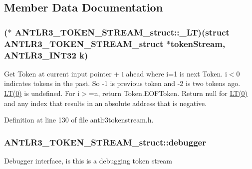 \subsection{Member Data Documentation}
\hypertarget{struct_a_n_t_l_r3___t_o_k_e_n___s_t_r_e_a_m__struct_ab0aa60f67331ab45398ff1f5aa5e4e98}{
\subsubsection[{\-\_\-\-L\-T}]{($\ast$ A\-N\-T\-L\-R3\-\_\-\-T\-O\-K\-E\-N\-\_\-\-S\-T\-R\-E\-A\-M\-\_\-struct\-::\-\_\-\-L\-T)(struct {\bf A\-N\-T\-L\-R3\-\_\-\-T\-O\-K\-E\-N\-\_\-\-S\-T\-R\-E\-A\-M\-\_\-struct} $\ast$token\-Stream, {\bf A\-N\-T\-L\-R3\-\_\-\-I\-N\-T32} k)}}\label{struct_a_n_t_l_r3___t_o_k_e_n___s_t_r_e_a_m__struct_ab0aa60f67331ab45398ff1f5aa5e4e98}
Get Token at current input pointer + i ahead where i=1 is next Token. i$<$0 indicates tokens in the past. So -\/1 is previous token and -\/2 is two tokens ago. \hyperlink{cif_parser_8cpp_a835a564399f4498da6ccbef2dcdd277e}{L\-T(0)} is undefined. For i$>$=n, return Token.\-E\-O\-F\-Token. Return null for \hyperlink{cif_parser_8cpp_a835a564399f4498da6ccbef2dcdd277e}{L\-T(0)} and any index that results in an absolute address that is negative. 

Definition at line 130 of file antlr3tokenstream.\-h.

\hypertarget{struct_a_n_t_l_r3___t_o_k_e_n___s_t_r_e_a_m__struct_ad1c4befd9be9830fbe87993c4b944f0d}{
\subsubsection[{debugger}]{ A\-N\-T\-L\-R3\-\_\-\-T\-O\-K\-E\-N\-\_\-\-S\-T\-R\-E\-A\-M\-\_\-struct\-::debugger}}\label{struct_a_n_t_l_r3___t_o_k_e_n___s_t_r_e_a_m__struct_ad1c4befd9be9830fbe87993c4b944f0d}
Debugger interface, is this is a debugging token stream 

